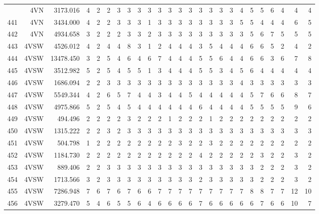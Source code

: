 \documentclass[12pt]{article}\usepackage[]{graphicx}\usepackage[]{color}
\begin{document}
\begin{landscape}
\begin{longtable}[t]{crrrrrrrrrrrrrrrcrrrrrrrr}
\endfoot
\bottomrule
\endlastfoot
440 & 4VN & 3173.016 & 4 & 2 & 2 & 3 & 3 & 3 & 3 & 3 & 3 & 3 & 3 & 3 & 3 & 3 & 3 & 4 & 5 & 5 & 6 & 4 & 4 & 4\\
441 & 4VN & 3434.000 & 4 & 2 & 2 & 3 & 3 & 3 & 1 & 3 & 3 & 3 & 3 & 3 & 3 & 3 & 3 & 5 & 5 & 4 & 4 & 4 & 6 & 5\\
442 & 4VN & 4934.658 & 3 & 2 & 2 & 2 & 3 & 3 & 2 & 3 & 3 & 3 & 3 & 3 & 3 & 3 & 3 & 3 & 5 & 6 & 7 & 5 & 5 & 5\\
443 & 4VSW & 4526.012 & 4 & 2 & 4 & 4 & 8 & 3 & 1 & 2 & 4 & 4 & 4 & 3 & 5 & 4 & 4 & 4 & 6 & 6 & 5 & 2 & 4 & 2\\
444 & 4VSW & 13478.450 & 3 & 2 & 5 & 4 & 6 & 4 & 6 & 7 & 4 & 4 & 4 & 5 & 5 & 6 & 4 & 4 & 6 & 6 & 3 & 6 & 7 & 8\\
445 & 4VSW & 3512.982 & 5 & 2 & 5 & 4 & 5 & 5 & 1 & 3 & 4 & 4 & 4 & 5 & 5 & 3 & 4 & 5 & 6 & 4 & 4 & 4 & 4 & 4\\
446 & 4VSW & 1686.094 & 2 & 2 & 3 & 3 & 3 & 3 & 3 & 3 & 3 & 3 & 3 & 3 & 3 & 3 & 3 & 4 & 3 & 3 & 3 & 3 & 3 & 3\\
447 & 4VSW & 5549.344 & 4 & 2 & 6 & 5 & 7 & 4 & 4 & 3 & 4 & 4 & 5 & 4 & 4 & 4 & 4 & 4 & 5 & 7 & 6 & 6 & 8 & 7\\
448 & 4VSW & 4975.866 & 5 & 2 & 5 & 4 & 5 & 4 & 4 & 4 & 4 & 4 & 4 & 6 & 4 & 4 & 4 & 4 & 5 & 5 & 5 & 5 & 9 & 6\\
449 & 4VSW & 494.496 & 2 & 2 & 2 & 2 & 3 & 2 & 2 & 2 & 1 & 2 & 2 & 2 & 1 & 2 & 2 & 2 & 2 & 2 & 2 & 2 & 2 & 2\\
450 & 4VSW & 1315.222 & 2 & 2 & 3 & 2 & 3 & 3 & 3 & 3 & 3 & 3 & 3 & 3 & 3 & 3 & 3 & 3 & 3 & 3 & 3 & 3 & 3 & 3\\
451 & 4VSW & 504.798 & 1 & 2 & 2 & 2 & 2 & 2 & 2 & 2 & 2 & 3 & 2 & 2 & 3 & 2 & 2 & 2 & 2 & 2 & 2 & 2 & 2 & 2\\
452 & 4VSW & 1184.730 & 2 & 2 & 2 & 2 & 2 & 2 & 2 & 2 & 2 & 2 & 2 & 4 & 2 & 2 & 2 & 2 & 2 & 3 & 2 & 2 & 3 & 2\\
453 & 4VSW & 889.406 & 2 & 2 & 3 & 3 & 3 & 3 & 3 & 3 & 3 & 3 & 3 & 3 & 3 & 3 & 3 & 3 & 3 & 2 & 2 & 2 & 3 & 2\\
454 & 4VSW & 1713.566 & 3 & 2 & 3 & 3 & 3 & 3 & 3 & 3 & 3 & 3 & 3 & 2 & 3 & 3 & 3 & 3 & 3 & 2 & 2 & 2 & 3 & 2\\
455 & 4VSW & 7286.948 & 7 & 6 & 7 & 6 & 7 & 6 & 6 & 7 & 7 & 7 & 7 & 7 & 7 & 7 & 7 & 7 & 8 & 8 & 7 & 7 & 12 & 10\\
456 & 4VSW & 3279.470 & 5 & 4 & 6 & 5 & 5 & 6 & 4 & 6 & 6 & 6 & 6 & 7 & 6 & 6 & 6 & 6 & 6 & 7 & 6 & 6 & 10 & 7\\

\end{longtable}
\end{landscape}
\end{document}
